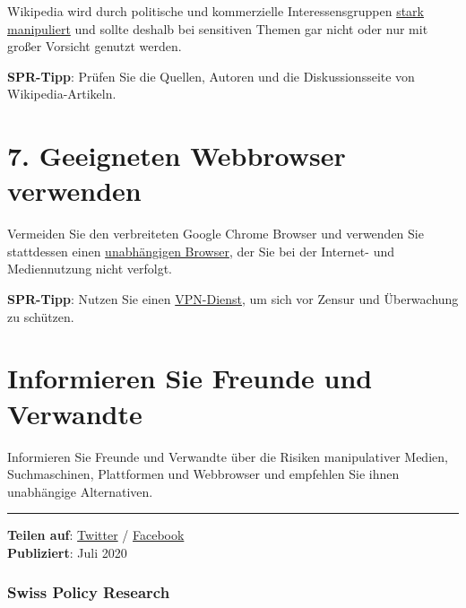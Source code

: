 Wikipedia wird durch politische und kommerzielle Interessensgruppen
\href{https://swprs.org/wikipedia-disinformation-operation/}{stark
manipuliert} und sollte deshalb bei sensitiven Themen gar nicht oder nur
mit großer Vorsicht genutzt werden.

\textbf{SPR-Tipp}: Prüfen Sie die Quellen, Autoren und die
Diskussionsseite von Wikipedia-Artikeln.

\hypertarget{7-geeigneten-webbrowser-verwenden}{%
\section{7. Geeigneten Webbrowser
verwenden}\label{7-geeigneten-webbrowser-verwenden}}

Vermeiden Sie den verbreiteten Google Chrome Browser und verwenden Sie
stattdessen einen
\href{https://protonmail.com/blog/best-browser-for-privacy/}{unabhängigen
Browser}, der Sie bei der Internet- und Mediennutzung nicht verfolgt.

\textbf{SPR-Tipp}: Nutzen Sie einen
\href{https://uk.pcmag.com/vpn/138/the-best-vpn-services}{VPN-Dienst},
um sich vor Zensur und Überwachung zu schützen.

\hypertarget{informieren-sie-freunde-und-verwandte}{%
\section{Informieren Sie Freunde und
Verwandte}\label{informieren-sie-freunde-und-verwandte}}

Informieren Sie Freunde und Verwandte über die Risiken manipulativer
Medien, Suchmaschinen, Plattformen und Webbrowser und empfehlen Sie
ihnen unabhängige Alternativen.

\begin{center}\rule{0.5\linewidth}{\linethickness}\end{center}

\textbf{Teilen auf}:
\href{https://twitter.com/intent/tweet?url=https://swprs.org/mediennutzung-sieben-tipps/}{Twitter}
/
\href{https://www.facebook.com/share.php?u=https://swprs.org/mediennutzung-sieben-tipps/}{Facebook}\\
\textbf{Publiziert}: Juli 2020

\hypertarget{swiss-policy-research}{%
\subsubsection{Swiss Policy Research}\label{swiss-policy-research}}

